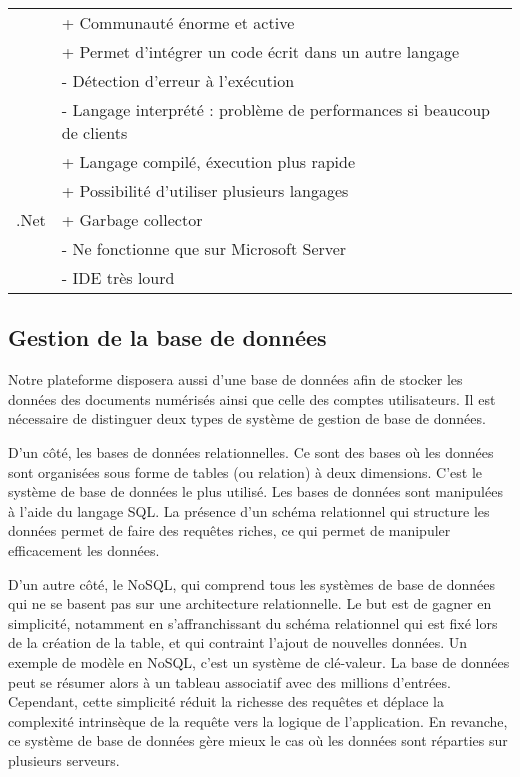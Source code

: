 \begin{tabular}{|l|l|}
                & + Communauté énorme et active \\
                & + Permet d’intégrer un code écrit dans un autre langage \\
                & - Détection d’erreur à l’exécution \\
                & - Langage interprété : problème de performances si beaucoup de clients \\ \hline
            \multirow{6}{*}{.Net} & + Langage compilé, éxecution plus rapide \\
                & + Possibilité d'utiliser plusieurs langages \\
                & + Garbage collector \\
                & - Ne fonctionne que sur Microsoft Server \\
                & - IDE très lourd \\ 
            \hline
        \end{tabular}

    \subsection{Gestion de la base de données}
    \label{subsec:bdd}

   Notre plateforme disposera aussi d’une base de données afin de stocker les données des documents numérisés
   ainsi que celle des comptes utilisateurs. Il est nécessaire de distinguer deux types de système de gestion de base de données.

    D’un côté, les bases de données relationnelles. Ce sont des bases où les données sont organisées
    sous forme de tables (ou relation) à deux dimensions. C’est le système de base de données le plus utilisé.
    Les bases de données sont manipulées à l’aide du langage SQL. La présence d’un schéma relationnel qui structure
    les données permet de faire des requêtes riches, ce qui permet de manipuler efficacement les données.

    D’un autre côté, le NoSQL, qui comprend tous les systèmes de base de données qui ne se basent pas sur une
    architecture relationnelle. Le but est de gagner en simplicité, notamment en s’affranchissant du schéma relationnel
    qui est fixé lors de la création de la table, et qui contraint l’ajout de nouvelles données. Un exemple de modèle en NoSQL,
    c’est un système de clé-valeur. La base de données peut se résumer alors à un tableau associatif avec des millions d’entrées.
    Cependant, cette simplicité réduit la richesse des requêtes et déplace la complexité intrinsèque de la requête vers
    la logique de l’application. En revanche, ce système de base de données gère mieux le cas où les données sont réparties
    sur plusieurs serveurs.

